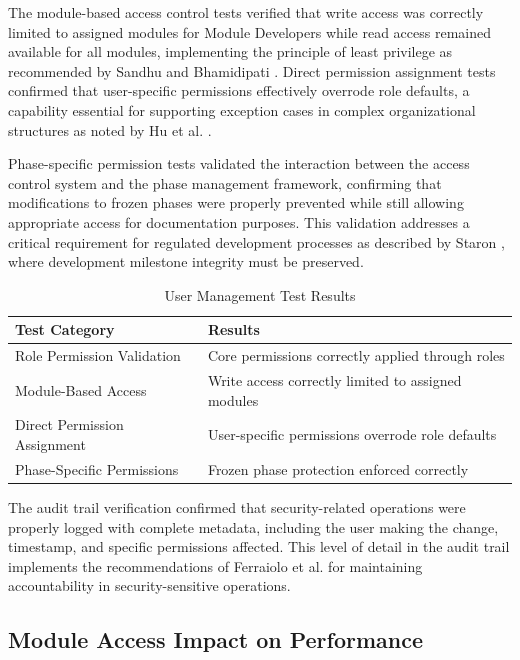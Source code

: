 The module-based access control tests verified that write access was correctly limited to assigned modules for Module Developers while read access remained available for all modules, implementing the principle of least privilege as recommended by Sandhu and Bhamidipati \cite{sandhu1997arbac97}. Direct permission assignment tests confirmed that user-specific permissions effectively overrode role defaults, a capability essential for supporting exception cases in complex organizational structures as noted by Hu et al. \cite{hu2015implementing}.

Phase-specific permission tests validated the interaction between the access control system and the phase management framework, confirming that modifications to frozen phases were properly prevented while still allowing appropriate access for documentation purposes. This validation addresses a critical requirement for regulated development processes as described by Staron \cite{staron2021automotive}, where development milestone integrity must be preserved.

\begin{table}[h]
    \centering
    \caption{User Management Test Results}
    \label{tab:rbac-test-results}
    \begin{tabular}{|p{3cm}|p{5cm}|}
    \hline
    \textbf{Test Category} & \textbf{Results} \\
    \hline
    Role Permission Validation & Core permissions correctly applied through roles \\
    \hline
    Module-Based Access & Write access correctly limited to assigned modules \\
    \hline
    Direct Permission Assignment & User-specific permissions overrode role defaults \\
    \hline
    Phase-Specific Permissions & Frozen phase protection enforced correctly \\
    \hline
    \end{tabular}
\end{table}

The audit trail verification confirmed that security-related operations were properly logged with complete metadata, including the user making the change, timestamp, and specific permissions affected. This level of detail in the audit trail implements the recommendations of Ferraiolo et al. \cite{ferraiolo2011policy} for maintaining accountability in security-sensitive operations.

\subsection{Module Access Impact on Performance}
\label{subsec:module-access-impact}

